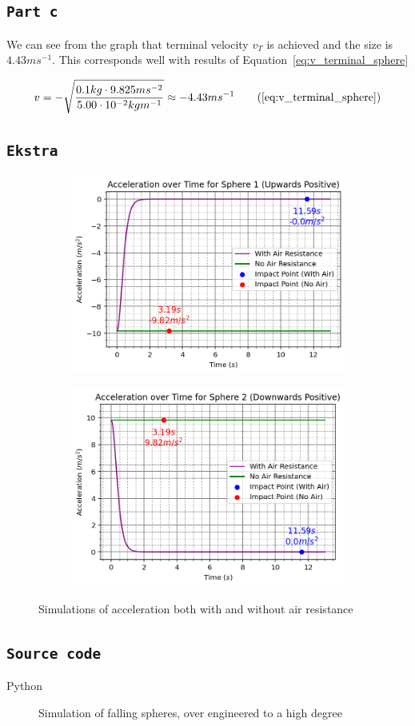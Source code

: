 \documentclass{article}
\let\oldsubsection\subsection
\renewcommand{\subsection}[1]{%
  \oldsubsection{\texttt{#1}}%
  \setcounter{subsubsection}{-1}%
}
\newcommand{\writecode}[3][Example Code]{%
    \begin{codeBlock}{#1}%
    \end{codeBlock}%
    \begin{figure}[h] %
        \centering
        \renewcommand\figurename{Code}
        \caption{#3} %
        \label{Code:#2} %
    \end{figure}
}
\begin{document}
\subsection{Part c}
We can see from the graph that terminal velocity \(v_T\) is achieved and the size is \(4.43ms^{-1}\). This corresponds well with results of Equation~\ref{eq:v_terminal_sphere}

\begin{equation*}
    v = -\sqrt{\frac{0.1kg \cdot 9.825 ms^{-2}}{5.00 \cdot10^{-2}kgm^{-1}}} \approx -4.43ms^{-1}
    \tag{\ref{eq:v_terminal_sphere}}
\end{equation*}

\clearpage
\subsection{Ekstra}
\begin{figure}[h]
    \centering
    \begin{subfigure}{0.8\textwidth}
        \centering
        \includegraphics[width=1\textwidth]{Figures/at1.png}
    \end{subfigure}
    \begin{subfigure}{0.8\textwidth}
        \centering
        \includegraphics[width=1\textwidth]{Figures/at2.png}
    \end{subfigure}
    \caption{Simulations of acceleration both with and without air resistance}
    \label{fig:sim_a}
\end{figure}

\clearpage
\subsection{Source code} \label{subsection:code}
\writecode[Python]{Simulator.py}{Simulation of falling spheres, over engineered to a high degree}
\end{document}
